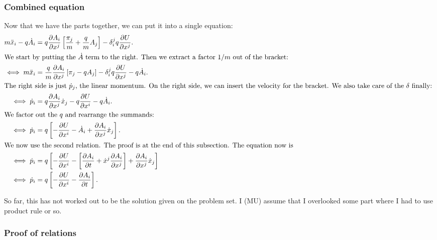 \documentclass[11pt, english, fleqn, DIV=15, headinclude, BCOR=1cm]{scrartcl}
\begin{document}
\subsubsection{Combined equation}

Now that we have the parts together, we can put it into a single equation:
\begin{align*}
    m \ddot x_i - q \dot A_i &= 
    q \pd{A_i}{x^j}
    \sbr{\frac{\pi_j}m + \frac qm A_j}
    -
    \delta_i^j
    q \pd{U}{x^j}. \\
    \intertext{%
        We start by putting the $\dot A$ term to the right. Then we extract a
        factor $1/m$ out of the bracket:
    }
    \iff m \ddot x_i &= \frac qm \pd{A_i}{x^j} \sbr{\pi_j - q
    A_j} - \delta_i^j q \pd{U}{x^j} - q \dot A_i. \\
    \intertext{%
        The right side is just $\dot p_j$, the linear momentum. On the right
        side, we can insert the velocity for the bracket. We also take care of
        the $\delta$ finally:
    }
    \iff \dot p_i &= q \pd{A_i}{x^j} \dot x_j - q \pd{U}{x^i} - q \dot A_i. \\
    \intertext{%
        We factor out the $q$ and rearrange the summands:
    }
    \iff \dot p_i &= q \sbr{- \pd{U}{x^i} - \dot A_i + \pd{A_i}{x^j} \dot x_j}. \\
    \intertext{%
        We now use the second relation. The proof is at the end of this
        subsection. The equation now is
    }
    \iff \dot p_i &= q \sbr{- \pd{U}{x^i} - \sbr{\pd{A_i}t + \dot x^j
    \pd{A_i}{x^j}} + \pd{A_i}{x^j} \dot x_j} \\
    \iff \dot p_i &= q \sbr{- \pd{U}{x^i} - \pd{A_i}t}. \\
\end{align*}

\begin{note}
    So far, this has not worked out to be the solution given on the problem
    set. I (MU) assume that I overlooked some part where I had to use product
    rule or so.
\end{note}

\subsubsection{Proof of relations}
\end{document}

